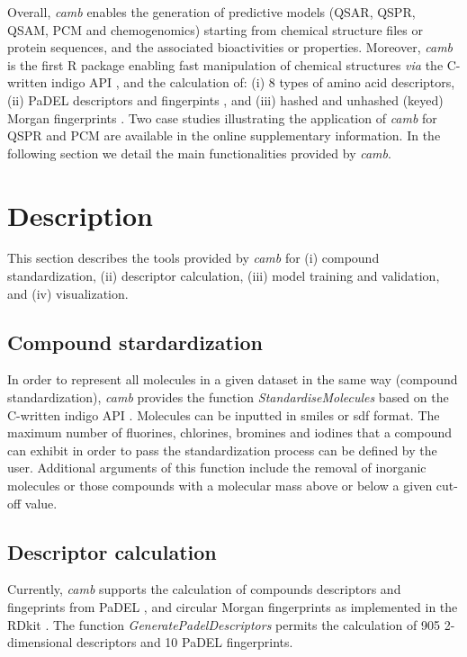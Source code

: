 \documentclass{bioinfo}
\begin{document}
Overall, {\it camb} enables the generation of predictive  models (QSAR, QSPR, QSAM, PCM and chemogenomics)
starting from chemical structure files or protein sequences, and the associated bioactivities or properties.
Moreover, {\it camb} is the first R package enabling fast manipulation of chemical structures {\it via} the C-written indigo API \citep{indigo},
and the calculation of:
(i) 8 types of amino acid descriptors,
(ii) PaDEL descriptors and fingerpints \citep{padel},
and (iii) hashed and unhashed (keyed) Morgan fingerprints \citep{extended_fp}.
Two case studies illustrating the application of {\it camb} for
QSPR and PCM are available in the online supplementary information.
In the following section we detail the main functionalities provided by {\it camb}. 

\section{Description}
This section describes the tools provided by {\it camb} 
for (i) compound standardization, (ii) descriptor calculation, 
(iii) model training and validation, and (iv) visualization.

\subsection{Compound stardardization}

In order to represent all molecules in a given dataset in the same 
way (compound standardization),
{\it camb}  provides the function {\it StandardiseMolecules} based on the C-written indigo API \citep{indigo}.
Molecules can be inputted in smiles or sdf format. 
The maximum number of fluorines, chlorines, bromines and iodines 
that a compound can exhibit in order to pass the standardization process can be defined by the user.
Additional arguments of this function include the removal of inorganic molecules
or those compounds with a molecular mass above or below a given cut-off value.

\subsection{Descriptor calculation} 

Currently, {\it camb} supports the calculation of compounds descriptors and fingeprints from PaDEL \citep{padel},
and circular Morgan fingerprints \citep{extended_fp} as implemented in the RDkit \citep{rdkit}.
The function {\it GeneratePadelDescriptors} permits the calculation of 905 2-dimensional descriptors and 10 PaDEL fingerprints.
\end{document}
